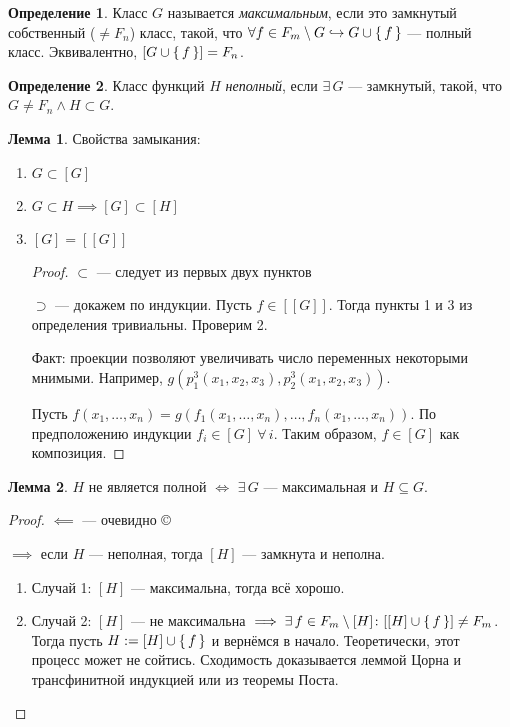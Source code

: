 \documentclass[12pt]{article}
\let\un\cup
\let\wot\setminus
\theoremstyle{definition}
\newtheorem{definition}{Определение}[section]
\theoremstyle{statement}
\theoremstyle{theorem}
\newtheorem{lemma}{Лемма}[section]
\begin{document}
\begin{definition}
  Класс $G$ называется \textit{максимальным}, если это замкнутый
  собственный ($\neq F_n$) класс, такой, что $\forall f \in F_m \wot
  G \hookrightarrow G \un \set{f}$ --- полный класс. Эквивалентно,
  $[G \un \set{f}] = F_n$.
\end{definition}
\begin{definition}
  Класс функций $H$ \textit{неполный}, если $\exists\, G$ ---
  замкнутый, такой, что $G \neq F_n \land H \subset G$.
\end{definition}
\begin{lemma}
  Свойства замыкания:
  \begin{enumerate}
    \item $G \subset [G]$

    \item $G \subset H \implies [G] \subset [H]$

    \item $[G] = [[G]]$
      \begin{proof}
        $\subset$ --- следует из первых двух пунктов

        $\supset$ --- докажем по индукции. Пусть $f \in [[G]]$. Тогда
        пункты 1 и 3 из определения тривиальны. Проверим 2.

        Факт: проекции позволяют увеличивать число переменных
        некоторыми мнимыми. Например, $g(p_1^3(x_1, x_2, x_3),
        p_2^3(x_1, x_2, x_3))$.

        Пусть $f(x_1, \ldots, x_n) = g(f_1(x_1, \ldots, x_n), \ldots,
        f_n(x_1, \ldots, x_n))$. По предположению индукции $f_i \in
        [G]\ \forall\, i$. Таким образом, $f \in [G]$ как композиция.
      \end{proof}
  \end{enumerate}
\end{lemma}
\begin{lemma}
  $H$ не является полной $\iff$ $\exists\, G$ --- максимальная и $H
  \subseteq G$.
  \begin{proof}
    $\impliedby$ --- очевидно \copyright

    $\implies$ если $H$ --- неполная, тогда $[H]$ --- замкнута и неполна.
    \begin{enumerate}
      \item Случай 1: $[H]$ --- максимальна, тогда всё хорошо.

      \item Случай 2: $[H]$ --- не максимальна $\implies \exists\, f
        \in F_m \wot [H] \colon [[H] \un \set{f}] \neq F_m$. Тогда
        пусть $H := [H] \un \set{f}$ и вернёмся в начало.
        Теоретически, этот процесс может не сойтись. Сходимость
        доказывается леммой Цорна и трансфинитной индукцией или из
        теоремы Поста.
    \end{enumerate}
  \end{proof}
\end{lemma}
\end{document}
